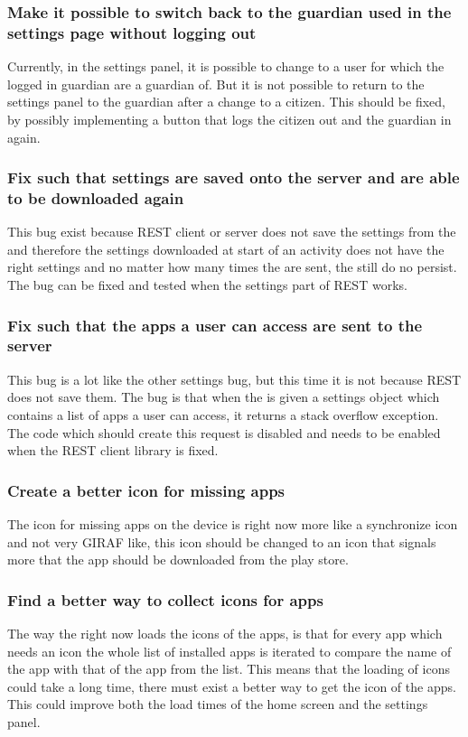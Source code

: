 \subsubsection{Make it possible to switch back to the guardian used in the
settings page without logging out}
Currently, in the settings panel, it is possible to change to a user for which
the logged in guardian are a guardian of. But it is not possible to return to the
settings panel to the guardian after a change to a citizen. This should be
fixed, by possibly implementing a button that logs the citizen out and the
guardian in again.
  
\subsubsection{Fix such that settings are saved onto the server and are able to
be downloaded again}
This bug exist because REST client or server does not save the settings from the
 and therefore the settings downloaded at start of an
activity does not have the right settings and no matter how many times the are
sent, the still do no persist. The bug can be fixed and tested when the settings
part of REST works.

\subsubsection{Fix such that the apps a user can access are sent to the server}
This bug is a lot like the other settings bug, but this time it is not because
REST does not save them. The bug is that when the  is
given a settings object which contains a list of apps a user can access, it
returns a stack overflow exception. The code which should create this request is
disabled and needs to be enabled when the REST client library is fixed.

\subsubsection{Create a better icon for missing apps}
The icon for missing apps on the device is right now more like a synchronize icon
and not very GIRAF like, this icon should be changed to an icon that signals
more that the app should be downloaded from the play store.

\subsubsection{Find a better way to collect icons for apps}
The way the  right now loads the icons of the apps, is that for
every app which needs an icon the whole list of installed apps is iterated to
compare the name of the app with that of the app from the list. This means that
the loading of icons could take a long time, there must exist a better way to
get the icon of the apps. This could improve both the load times of the home
screen and the settings panel.

